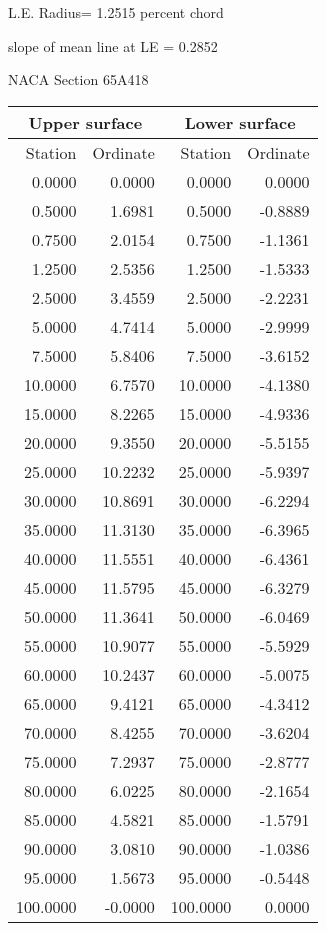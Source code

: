 \documentclass[11pt]{book}
\begin{document}
L.E. Radius=  1.2515 percent chord


 slope of mean line at LE =  0.2852
 \newpage
  \label{s65A418}
 \begin{Large}
 NACA Section 65A418
 \end{Large}
  
 \vspace{8mm}
 \begin{tabular}{|r|r|r|r|} \hline 
 \multicolumn{2}{|c|}{Upper surface} & \multicolumn{2}{|c|}{Lower surface} \\
 \hline
 Station & Ordinate & Station & Ordinate \\
 \hline
0.0000 & 0.0000 & 0.0000 & 0.0000 \\
0.5000 & 1.6981 & 0.5000 & -0.8889 \\
0.7500 & 2.0154 & 0.7500 & -1.1361 \\
1.2500 & 2.5356 & 1.2500 & -1.5333 \\
2.5000 & 3.4559 & 2.5000 & -2.2231 \\
5.0000 & 4.7414 & 5.0000 & -2.9999 \\
7.5000 & 5.8406 & 7.5000 & -3.6152 \\
10.0000 & 6.7570 & 10.0000 & -4.1380 \\
15.0000 & 8.2265 & 15.0000 & -4.9336 \\
20.0000 & 9.3550 & 20.0000 & -5.5155 \\
25.0000 & 10.2232 & 25.0000 & -5.9397 \\
30.0000 & 10.8691 & 30.0000 & -6.2294 \\
35.0000 & 11.3130 & 35.0000 & -6.3965 \\
40.0000 & 11.5551 & 40.0000 & -6.4361 \\
45.0000 & 11.5795 & 45.0000 & -6.3279 \\
50.0000 & 11.3641 & 50.0000 & -6.0469 \\
55.0000 & 10.9077 & 55.0000 & -5.5929 \\
60.0000 & 10.2437 & 60.0000 & -5.0075 \\
65.0000 & 9.4121 & 65.0000 & -4.3412 \\
70.0000 & 8.4255 & 70.0000 & -3.6204 \\
75.0000 & 7.2937 & 75.0000 & -2.8777 \\
80.0000 & 6.0225 & 80.0000 & -2.1654 \\
85.0000 & 4.5821 & 85.0000 & -1.5791 \\
90.0000 & 3.0810 & 90.0000 & -1.0386 \\
95.0000 & 1.5673 & 95.0000 & -0.5448 \\
100.0000 & -0.0000 & 100.0000 & 0.0000 \\
 \hline 
 \end{tabular}
\end{document}
